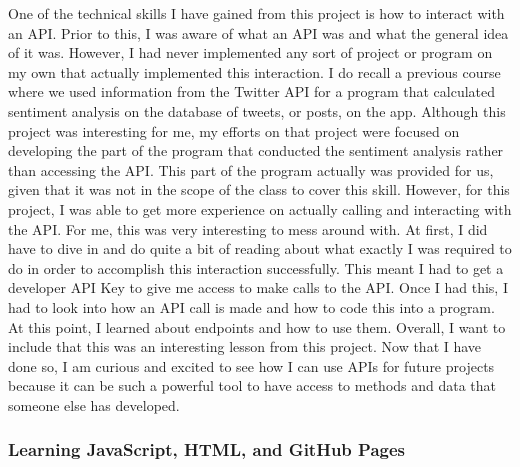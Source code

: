 \documentclass{article}
\theoremstyle{theorem}
\theoremstyle{definition}
\theoremstyle{remark}
\begin{document}
One of the technical skills I have gained from this project is how to interact with an API. Prior to this, I was aware of what an API was and what the general idea of it was. However, I had never implemented any sort of project or program on my own that actually implemented this interaction. I do recall 
a previous course where we used information from the Twitter API for a program that calculated sentiment analysis on the database of tweets, or posts, on the app. Although this project was interesting for me, my efforts on that project were focused on developing the part of the program that conducted the 
sentiment analysis rather than accessing the API. This part of the program actually was provided for us, given that it was not in the scope of the class to cover this skill. However, for this project, I was able to get more experience on actually calling and interacting with the API. For me, this was very 
interesting to mess around with. At first, I did have to dive in and do quite a bit of reading about what exactly I was required to do in order to accomplish this interaction successfully. This meant I had to get a developer API Key to give me access to make calls to the API. Once I had this, I had to look into 
how an API call is made and how to code this into a program. At this point, I learned about endpoints and how to use them. Overall, I want to include that this was an interesting lesson from this project. Now that I have done so, I am curious and excited to see how I can use APIs for future projects because 
it can be such a powerful tool to have access to methods and data that someone else has developed. \\

\subsubsection{Learning JavaScript, HTML, and GitHub Pages}
\end{document}
